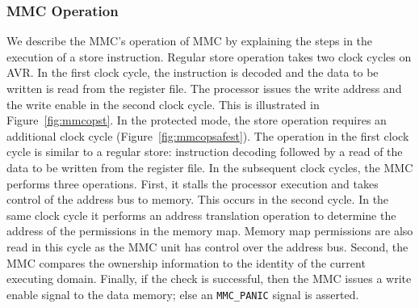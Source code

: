 \subsubsection{MMC Operation}
%
We describe the MMC's operation of MMC by explaining the steps in
the execution of a store instruction.
%
Regular store operation takes two clock cycles on AVR.
%
In the first clock cycle, the instruction is decoded and the data to
be written is read from the register file.
%
The processor issues the write address and the write enable in the
second clock cycle.
%
This is illustrated in Figure~\ref{fig:mmcopst}.
%
In the protected mode, the store operation requires an additional
clock cycle (Figure~\ref{fig:mmcopsafest}).
%
The operation in the first clock cycle is similar to a regular store:
instruction decoding followed by a read of the data to be written from
the register file.
%
In the subsequent clock cycles, the MMC performs three operations.
%
First, it stalls the processor execution and takes control of the
address bus to memory.
%
This occurs in the second cycle.
%
In the same clock cycle it performs an address translation operation
to determine the address of the permissions in the memory map.
%
%
Memory map permissions are also read in this cycle as the MMC unit has
control over the address bus.
%
Second, the MMC compares the ownership information to the identity of
the current executing domain.
%
%
Finally, if the check is successful, then the MMC issues a write
enable signal to the data memory; else an \texttt{MMC\_PANIC} signal is
asserted.
%
%

%
%
